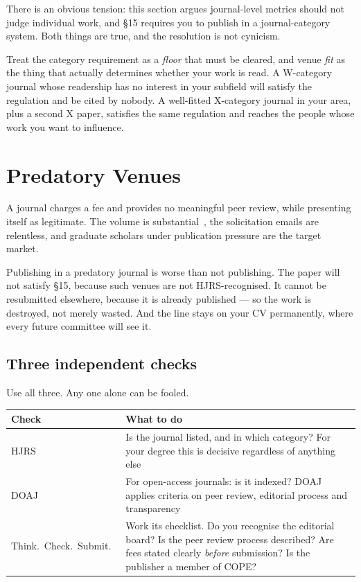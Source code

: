 \begin{conceptbox}
There is an obvious tension: this section argues journal-level metrics should
not judge individual work, and \S15 requires you to publish in a
journal-category system. Both things are true, and the resolution is not
cynicism.

\medskip
Treat the category requirement as a \emph{floor} that must be cleared, and
venue \emph{fit} as the thing that actually determines whether your work is
read. A W-category journal whose readership has no interest in your subfield
will satisfy the regulation and be cited by nobody. A well-fitted X-category
journal in your area, plus a second X paper, satisfies the same regulation and
reaches the people whose work you want to influence.
\end{conceptbox}

\section{Predatory Venues}

A  journal charges a fee and provides no meaningful peer
review, while presenting itself as legitimate. The volume is
substantial~\cite{shen2015predatory}, the solicitation emails are relentless,
and graduate scholars under publication pressure are the target market.

\begin{alertbox}
Publishing in a predatory journal is worse than not publishing. The paper will
not satisfy \S15, because such venues are not HJRS-recognised. It cannot be
resubmitted elsewhere, because it is already published --- so the work is
destroyed, not merely wasted. And the line stays on your CV permanently, where
every future committee will see it.
\end{alertbox}

\subsection{Three independent checks}

Use all three. Any one alone can be fooled.

\begin{center}
\small
\begin{tabular}{@{}L{3.4cm}L{11.0cm}@{}}
\toprule
\textbf{Check} & \textbf{What to do} \\
\midrule
HJRS
  & Is the journal listed, and in which category? For your degree this is
    decisive regardless of anything else \\
DOAJ~\cite{doaj}
  & For open-access journals: is it indexed? DOAJ applies criteria on peer
    review, editorial process and transparency \\
Think.\ Check.\ Submit.~\cite{thinkchecksubmit}
  & Work its checklist. Do you recognise the editorial board? Is the peer
    review process described? Are fees stated clearly \emph{before}
    submission? Is the publisher a member of COPE? \\
\bottomrule
\end{tabular}
\end{center}

